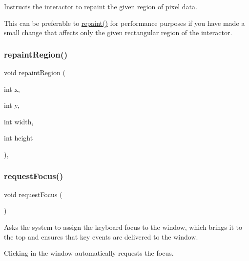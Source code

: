 Instructs the interactor to repaint the given region of pixel data. 

This can be preferable to \mbox{\hyperlink{classsgl_1_1GDrawingSurface_a4a8ae47b42f1e6a41b65d3546df46218}{repaint()}} for performance purposes if you have made a small change that affects only the given rectangular region of the interactor. \mbox{\label{classsgl_1_1GForwardDrawingSurface_a63af8fca5bf186367132ecf6af6f5eea}} 
\subsubsection{\texorpdfstring{repaint\+Region()}{repaintRegion()}\hspace{0.1cm}{\footnotesize\ttfamily [2/2]}}
{\footnotesize\ttfamily void repaint\+Region (\begin{DoxyParamCaption}\item[{int}]{x,  }\item[{int}]{y,  }\item[{int}]{width,  }\item[{int}]{height }\end{DoxyParamCaption})\hspace{0.3cm}{\ttfamily [override]}, {\ttfamily [inherited]}}

\mbox{\label{classsgl_1_1GWindow_a519fb2ac767f8b2febbb50b898b8c8cb}} 
\subsubsection{\texorpdfstring{request\+Focus()}{requestFocus()}}
{\footnotesize\ttfamily void request\+Focus (\begin{DoxyParamCaption}{ }\end{DoxyParamCaption})\hspace{0.3cm}{\ttfamily [virtual]}}



Asks the system to assign the keyboard focus to the window, which brings it to the top and ensures that key events are delivered to the window. 

Clicking in the window automatically requests the focus. \mbox{\label{classsgl_1_1GWindow_afd3595051be2709847c2de4352f27cf5}} 
